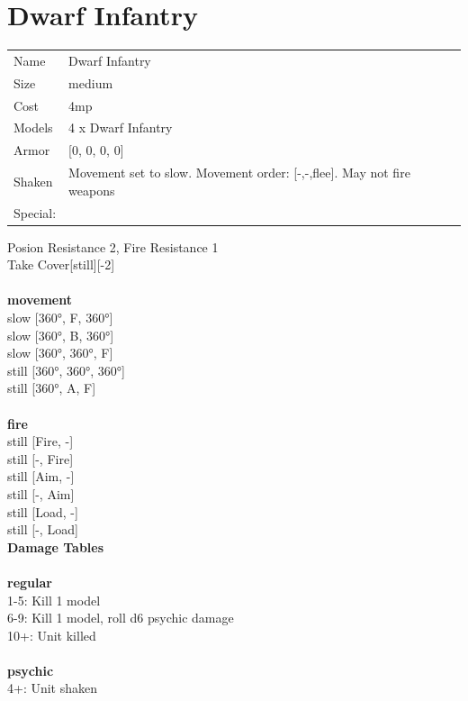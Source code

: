 \clearpage

\section{ Dwarf Infantry }

\begin{tabular}{ll}
  Name & Dwarf Infantry \\
  Size & medium\\
  Cost & 4mp\\
  Models & 4 x Dwarf Infantry\\
  Armor & [0, 0, 0, 0]\\
  Shaken & Movement set to slow. Movement order: [-,-,flee]. May not fire weapons\\
  Special: \\
\end{tabular}

\noindent Posion Resistance 2, Fire Resistance 1\\ 
Take Cover[still][-2]\\ 


\ \\ {\bf movement } \\
slow [360°, F, 360°] \\
slow [360°, B, 360°] \\
slow [360°, 360°, F] \\
still [360°, 360°, 360°] \\
still [360°, A, F] \\
\ \\ {\bf fire } \\
still [Fire, -] \\
still [-, Fire] \\
still [Aim, -] \\
still [-, Aim] \\
still [Load, -] \\
still [-, Load] \\


{\bf Damage Tables} \\
\ \\ {\bf regular } \\
1-5: Kill 1 model \\
6-9: Kill 1 model, roll d6 psychic damage \\
10+: Unit killed \\
\ \\ {\bf psychic } \\
4+: Unit shaken \\


